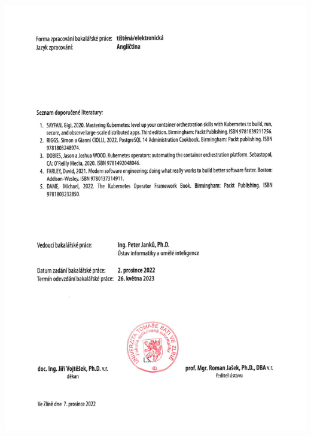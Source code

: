 {	\clearpage
	\thispagestyle{empty}
	\includegraphics[width=160mm]{graphics/zadani_p2.png}
}

\newcommand{\aktivujZahlavi}{
	\renewcommand{\headrulewidth}{1pt}
	\rhead{\thepage}

	\ifczech
		\lhead{\b{UTB ve Zlíně, \ifthenelse{\equal{\fakulta}{FAI}}{Fakulta aplikované informatiky}{\ifthenelse{\equal{\fakulta}{FAME}}{Fakulta managementu a ekonomiky}{\ifthenelse{\equal{\fakulta}{FHS}}{Fakulta humanitních studií}{\ifthenelse{\equal{\fakulta}{FLKR}}{Fakulta logistiky a krizového řízení}{\ifthenelse{\equal{\fakulta}{FMK}}{Fakulta multimediálních komunikací}{\ifthenelse{\equal{\fakulta}{FT}}{Fakulta technologická}{\ifthenelse{\equal{\fakulta}{UNI}}{Univerzitní institut}{}}}}}}}}}
	\else \ifenglish
			\lhead{\b{TBU in Zlín, \ifthenelse{\equal{\fakulta}{FAI}}{Faculty of Applied Informatics}{\ifthenelse{\equal{\fakulta}{FAME}}{Faculty of Management and Economics}{\ifthenelse{\equal{\fakulta}{FHS}}{Faculty of Humanities}{\ifthenelse{\equal{\fakulta}{FLKR}}{Faculty of Logistics and Crisis Management}{\ifthenelse{\equal{\fakulta}{FMK}}{Faculty of Multimedia Communications}{\ifthenelse{\equal{\fakulta}{FT}}{Faculty of Technology}{\ifthenelse{\equal{\fakulta}{UNI}}{University Institute}{}}}}}}}}}
		\fi \fi
}

